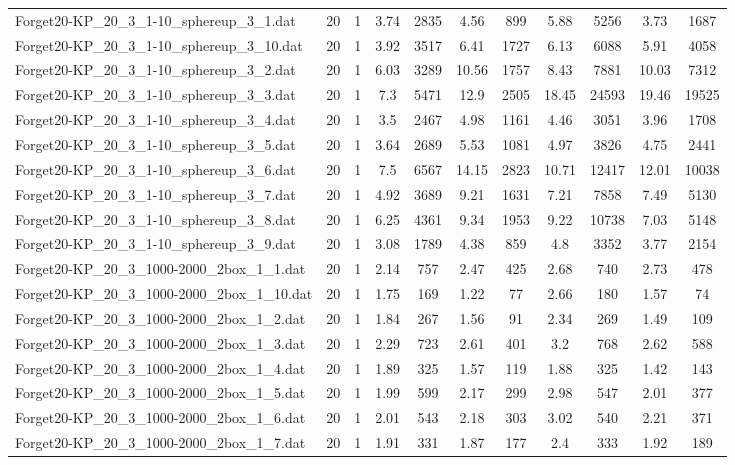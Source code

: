 \begin{table}[!ht]
\begin{tabular}{lcccccccccc}
Forget20-KP\_20\_3\_1-10\_sphereup\_3\_1.dat & 20 & 1 & 3.74 & 2835 & 4.56 & 899 & 5.88 & 5256 & 3.73 & 1687 \\
Forget20-KP\_20\_3\_1-10\_sphereup\_3\_10.dat & 20 & 1 & 3.92 & 3517 & 6.41 & 1727 & 6.13 & 6088 & 5.91 & 4058 \\
Forget20-KP\_20\_3\_1-10\_sphereup\_3\_2.dat & 20 & 1 & 6.03 & 3289 & 10.56 & 1757 & 8.43 & 7881 & 10.03 & 7312 \\
Forget20-KP\_20\_3\_1-10\_sphereup\_3\_3.dat & 20 & 1 & 7.3 & 5471 & 12.9 & 2505 & 18.45 & 24593 & 19.46 & 19525 \\
Forget20-KP\_20\_3\_1-10\_sphereup\_3\_4.dat & 20 & 1 & 3.5 & 2467 & 4.98 & 1161 & 4.46 & 3051 & 3.96 & 1708 \\
Forget20-KP\_20\_3\_1-10\_sphereup\_3\_5.dat & 20 & 1 & 3.64 & 2689 & 5.53 & 1081 & 4.97 & 3826 & 4.75 & 2441 \\
Forget20-KP\_20\_3\_1-10\_sphereup\_3\_6.dat & 20 & 1 & 7.5 & 6567 & 14.15 & 2823 & 10.71 & 12417 & 12.01 & 10038 \\
Forget20-KP\_20\_3\_1-10\_sphereup\_3\_7.dat & 20 & 1 & 4.92 & 3689 & 9.21 & 1631 & 7.21 & 7858 & 7.49 & 5130 \\
Forget20-KP\_20\_3\_1-10\_sphereup\_3\_8.dat & 20 & 1 & 6.25 & 4361 & 9.34 & 1953 & 9.22 & 10738 & 7.03 & 5148 \\
Forget20-KP\_20\_3\_1-10\_sphereup\_3\_9.dat & 20 & 1 & 3.08 & 1789 & 4.38 & 859 & 4.8 & 3352 & 3.77 & 2154 \\
Forget20-KP\_20\_3\_1000-2000\_2box\_1\_1.dat & 20 & 1 & 2.14 & 757 & 2.47 & 425 & 2.68 & 740 & 2.73 & 478 \\
Forget20-KP\_20\_3\_1000-2000\_2box\_1\_10.dat & 20 & 1 & 1.75 & 169 & 1.22 & 77 & 2.66 & 180 & 1.57 & 74 \\
Forget20-KP\_20\_3\_1000-2000\_2box\_1\_2.dat & 20 & 1 & 1.84 & 267 & 1.56 & 91 & 2.34 & 269 & 1.49 & 109 \\
Forget20-KP\_20\_3\_1000-2000\_2box\_1\_3.dat & 20 & 1 & 2.29 & 723 & 2.61 & 401 & 3.2 & 768 & 2.62 & 588 \\
Forget20-KP\_20\_3\_1000-2000\_2box\_1\_4.dat & 20 & 1 & 1.89 & 325 & 1.57 & 119 & 1.88 & 325 & 1.42 & 143 \\
Forget20-KP\_20\_3\_1000-2000\_2box\_1\_5.dat & 20 & 1 & 1.99 & 599 & 2.17 & 299 & 2.98 & 547 & 2.01 & 377 \\
Forget20-KP\_20\_3\_1000-2000\_2box\_1\_6.dat & 20 & 1 & 2.01 & 543 & 2.18 & 303 & 3.02 & 540 & 2.21 & 371 \\
Forget20-KP\_20\_3\_1000-2000\_2box\_1\_7.dat & 20 & 1 & 1.91 & 331 & 1.87 & 177 & 2.4 & 333 & 1.92 & 189 \\

\end{tabular}
\end{table}

